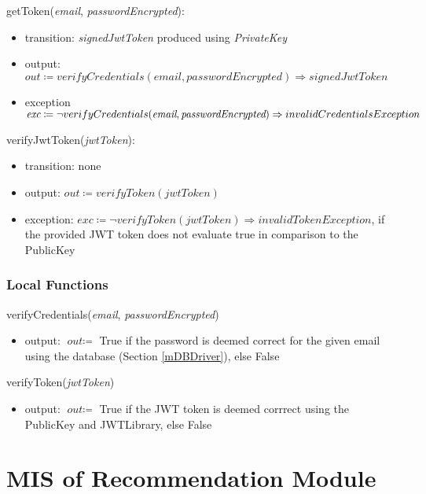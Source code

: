 \documentclass[12pt, titlepage]{article}
\begin{document}
\noindent getToken(\textit{email}, \textit{passwordEncrypted}):
\begin{itemize}
\item transition: \textit{signedJwtToken} produced using \textit{PrivateKey}
\item output: \( \textit{out} \coloneqq verifyCredentials(\textit{email}, \textit{passwordEncrypted}) \Rightarrow  signedJwtToken\) \\
\item exception \( \textit{exc} \coloneqq \neg verifyCredentials(\textit{email}, \textit{passwordEncrypted}) \Rightarrow \\ invalidCredentialsException\)
\end{itemize}

\noindent verifyJwtToken(\textit{jwtToken}):
\begin{itemize}
\item transition: none
\item output: \( \textit{out} \coloneqq verifyToken(\textit{jwtToken})\)
\item exception: \( \textit{exc} \coloneqq \neg verifyToken(\textit{jwtToken}) \Rightarrow invalidTokenException \), if the provided JWT token does not evaluate true in comparison to the PublicKey
\end{itemize}

\subsubsection{Local Functions}
verifyCredentials(\textit{email}, \textit{passwordEncrypted})
\begin{itemize}
\item output: \( \textit{out} \coloneqq \) True if the password is deemed correct for the given email using the database (Section \ref{mDBDriver}), else False
\end{itemize}

\noindent verifyToken(\textit{jwtToken})
\begin{itemize}
\item output: \( \textit{out} \coloneqq \) True if the JWT token is deemed corrrect using the PublicKey and JWTLibrary, else False
\end{itemize}

\newpage

\section{MIS of Recommendation Module} \label{mRecommendation}
\end{document}
